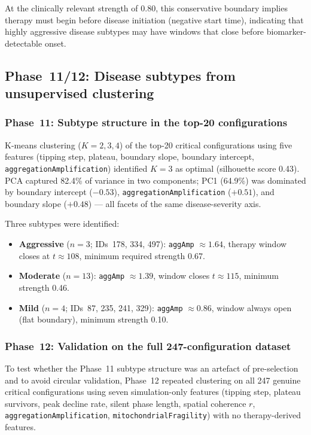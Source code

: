 \documentclass[12pt,a4paper]{article}
\begin{document}
At the clinically relevant strength of 0.80, this conservative boundary implies therapy must
begin before disease initiation (negative start time), indicating that highly aggressive disease
subtypes may have windows that close before biomarker-detectable onset.

\subsection{Phase~11/12: Disease subtypes from unsupervised clustering}

\subsubsection{Phase~11: Subtype structure in the top-20 configurations}

K-means clustering ($K = 2, 3, 4$) of the top-20 critical configurations using five features
(tipping step, plateau, boundary slope, boundary intercept, \texttt{aggregationAmplification})
identified $K = 3$ as optimal (silhouette score 0.43). PCA captured 82.4\% of variance in two
components; PC1 (64.9\%) was dominated by boundary intercept ($-0.53$),
\texttt{aggregationAmplification} ($+0.51$), and boundary slope ($+0.48$) --- all facets of
the same disease-severity axis.

Three subtypes were identified:
\begin{itemize}
\item \textbf{Aggressive} ($n = 3$; IDs~178, 334, 497): \texttt{aggAmp} $\approx 1.64$,
therapy window closes at $t \approx 108$, minimum required strength 0.67.
\item \textbf{Moderate} ($n = 13$): \texttt{aggAmp} $\approx 1.39$, window closes
$t \approx 115$, minimum strength 0.46.
\item \textbf{Mild} ($n = 4$; IDs~87, 235, 241, 329): \texttt{aggAmp} $\approx 0.86$,
window always open (flat boundary), minimum strength 0.10.
\end{itemize}

\subsubsection{Phase~12: Validation on the full 247-configuration dataset}

To test whether the Phase~11 subtype structure was an artefact of pre-selection and to avoid
circular validation, Phase~12 repeated clustering on all 247 genuine critical configurations
using seven simulation-only features (tipping step, plateau survivors, peak decline rate,
silent phase length, spatial coherence $r$, \texttt{aggregationAmplification},
\texttt{mitochondrialFragility}) with no therapy-derived features.
\end{document}
